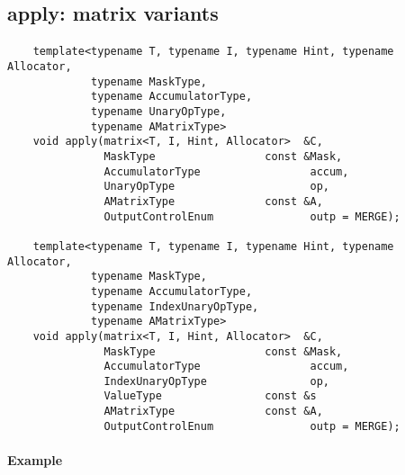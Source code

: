 \subsection{{\sf apply}: matrix variants}

\paragraph{\syntax}

\begin{verbatim}
    template<typename T, typename I, typename Hint, typename Allocator,
             typename MaskType,
             typename AccumulatorType,
             typename UnaryOpType,
             typename AMatrixType>
    void apply(matrix<T, I, Hint, Allocator>  &C,
               MaskType                 const &Mask,
               AccumulatorType                 accum,
               UnaryOpType                     op,
               AMatrixType              const &A,
               OutputControlEnum               outp = MERGE);

    template<typename T, typename I, typename Hint, typename Allocator,
             typename MaskType,
             typename AccumulatorType,
             typename IndexUnaryOpType,
             typename AMatrixType>
    void apply(matrix<T, I, Hint, Allocator>  &C,
               MaskType                 const &Mask,
               AccumulatorType                 accum,
               IndexUnaryOpType                op,
               ValueType                const &s
               AMatrixType              const &A,
               OutputControlEnum               outp = MERGE);
\end{verbatim}


\paragraph{Example}


